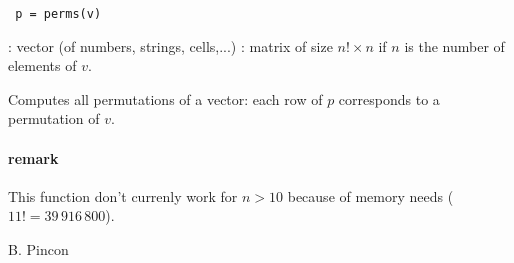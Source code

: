 
\begin{mandesc}
\end{mandesc}

\begin{calling_sequence}
\begin{verbatim}
 p = perms(v)
\end{verbatim}
\end{calling_sequence}

\begin{parameters}
  \begin{varlist}
   : vector (of numbers, strings, cells,...)
   : matrix of size $n! \times n$ if $n$ is the number of
               elements of $v$.
  \end{varlist}
\end{parameters}

\begin{mandescription}
  Computes all permutations of a vector: each row of $p$
  corresponds to a permutation of $v$. 

\paragraph{remark}
This function don't currenly work for $n > 10$ because of memory
needs ($11! = 39\,916\,800$).

\end{mandescription}

\begin{examples}
\begin{program}
\end{program}
\end{examples}



\begin{authors}
B. Pincon
\end{authors}

